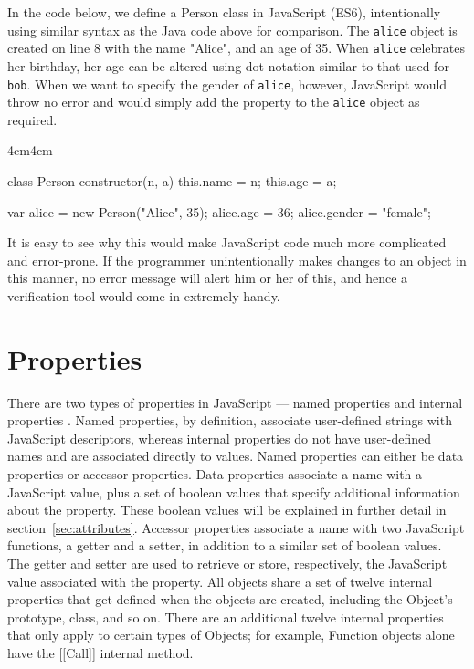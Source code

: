 \documentclass[a4paper,11pt,twoside]{report}
\def\jsinline{\lstinline[language=JavaScript, basicstyle=\small]}%\end{lstlisting}
\begin{document}
In the code below, we define a Person class in JavaScript (ES6), intentionally using similar syntax as the Java code above for comparison. The \jsinline|alice| object is created on line 8 with the name "Alice", and an age of 35. When \jsinline|alice| celebrates her birthday, her age can be altered using dot notation similar to that used for \jsinline|bob|. When we want to specify the gender of \jsinline|alice|, however, JavaScript would throw no error and would simply add the property to the \jsinline|alice| object as required.
\begin{adjustwidth}{4cm}{4cm}
\begin{lstjs}
class Person {
	constructor(n, a) {
		this.name = n;
		this.age = a;
	}
}

var alice = new Person("Alice", 35);
alice.age = 36;
alice.gender = "female";
\end{lstjs}
\end{adjustwidth}

It is easy to see why this would make JavaScript code much more complicated and error-prone. If the programmer unintentionally makes changes to an object in this manner, no error message will alert him or her of this, and hence a verification tool would come in extremely handy.

\section{Properties}
There are two types of properties in JavaScript --- named properties and internal properties \cite{EcmaScript}. Named properties, by definition, associate user-defined strings with JavaScript descriptors, whereas internal properties do not have user-defined names and are associated directly to values. Named properties can either be data properties or accessor properties. Data properties associate a name with a JavaScript value, plus a set of boolean values that specify additional information about the property. These boolean values will be explained in further detail in section~\ref{sec:attributes}. Accessor properties associate a name with two JavaScript functions, a getter and a setter, in addition to a similar set of boolean values. The getter and setter are used to retrieve or store, respectively, the JavaScript value associated with the property. All objects share a set of twelve internal properties that get defined when the objects are created, including the Object's prototype, class, and so on. There are an additional twelve internal properties that only apply to certain types of Objects; for example, Function objects alone have the [[Call]] internal method.
\end{document}

